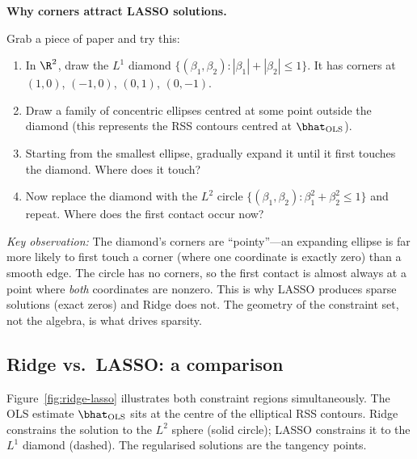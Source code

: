 \begin{stopandthink}
\textbf{Why corners attract LASSO solutions.}

Grab a piece of paper and try this:
\begin{enumerate}[nosep]
  \item In $\R^2$, draw the $L^1$ diamond
        $\{(\beta_1, \beta_2) : |\beta_1| + |\beta_2| \le 1\}$.
        It has corners at $(1,0)$, $(-1,0)$, $(0,1)$, $(0,-1)$.
  \item Draw a family of concentric ellipses centred at some point
        outside the diamond (this represents the RSS contours centred
        at $\bhat_{\text{OLS}}$).
  \item Starting from the smallest ellipse, gradually expand it until
        it first touches the diamond. Where does it touch?
  \item Now replace the diamond with the $L^2$ circle
        $\{(\beta_1, \beta_2) : \beta_1^2 + \beta_2^2 \le 1\}$
        and repeat. Where does the first contact occur now?
\end{enumerate}
\emph{Key observation:}
The diamond's corners are ``pointy''---an expanding ellipse is far more
likely to first touch a corner (where one coordinate is exactly zero)
than a smooth edge.
The circle has no corners, so the first contact is almost always at a
point where \emph{both} coordinates are nonzero.
This is why LASSO produces sparse solutions (exact zeros) and Ridge
does not.
The geometry of the constraint set, not the algebra, is what drives
sparsity.
\end{stopandthink}


\subsection{Ridge vs.\ LASSO: a comparison}

Figure~\ref{fig:ridge-lasso} illustrates both constraint regions
simultaneously.
The OLS estimate $\bhat_{\text{OLS}}$ sits at the centre of the
elliptical RSS contours.
Ridge constrains the solution to the $L^2$ sphere (solid circle);
LASSO constrains it to the $L^1$ diamond (dashed).
The regularised solutions are the tangency points.

